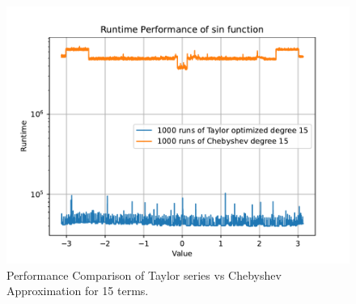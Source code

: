 \documentclass[12pt]{article}
\begin{document}
\begin{figure}[h]
    \centering
    \includegraphics[width=\textwidth]{plots/performance/inc_rel_pi_tay_vs_cheb.pdf}
    \caption{Performance Comparison of Taylor series vs Chebyshev Approximation for 15 terms.}
    \label{fig:cheb_vs_tay}
\end{figure}



\end{document}
